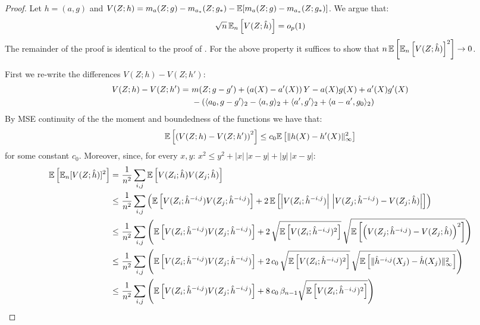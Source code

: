 \begin{proof}
Let $h=(a, g)$ and $V(Z; h)=m_{a}(Z; g) - m_{a_*}(Z; g_*) - \mathbb{E}[m_{a}(Z; g) - m_{a_*}(Z; g_*)]$. We argue that:
\begin{equation}
    \sqrt{n}\, \mathbb{E}_n\left[V(Z; \hat{h})\right] = o_p(1)
\end{equation}
The remainder of the proof is identical to the proof of . For the above property it suffices to show that $n\, \mathbb{E}\left[\mathbb{E}_n\left[V(Z; \hat{h})\right]^2\right] \to 0$.

First we re-write the differences $V(Z; h) - V(Z;h')$: 
\begin{align}
    V(Z; h) - V(Z;h') 
    =~& m(Z; g-g') + (a(X) - a'(X))\, Y - a(X) g(X) + a'(X) g'(X)\\
    & - \left(\langle a_0, g-g' \rangle_2 - \langle a, g \rangle_2 + \langle a', g' \rangle_2 + \langle a-a', g_0 \rangle_2\right)
\end{align}
By MSE continuity of the the moment and boundedness of the functions we have that:
\begin{equation}
\mathbb{E}\left[\left(V(Z; h) - V(Z; h')\right)^2\right] \leq c_0 \mathbb{E}\left[\|h(X) - h'(X)\|_{\infty}^2\right]
\end{equation}
for some constant $c_0$. Moreover, since, for every $x, y$: $x^2 \leq y^2 + |x|\, |x-y| + |y|\, |x-y|$:
\begin{align}
    \mathbb{E}\left[\mathbb{E}_n[V(Z; \hat{h})]^2\right] =~& \frac{1}{n^2} \sum_{i, j}\mathbb{E}\left[V(Z_i; \hat{h})  V(Z_j;\hat{h})\right]\\
    \leq~& \frac{1}{n^2}\sum_{i, j} \left(\mathbb{E}\left[V(Z_i;\hat{h}^{-i,j})  V(Z_j;\hat{h}^{-i,j})\right] + 2\, \mathbb{E}\left[\left|V(Z_i;\hat{h}^{-i,j})\right|\, \left|V(Z_j;\hat{h}^{-i,j}) - V(Z_j; \hat{h})\right|\right]\right)\\
    \leq~& \frac{1}{n^2}\sum_{i, j} \left(\mathbb{E}\left[V(Z_i;\hat{h}^{-i,j})  V(Z_j;\hat{h}^{-i,j})\right] + 2\, \sqrt{\mathbb{E}\left[V(Z_i;\hat{h}^{-i,j})^2\right]}\, \sqrt{\mathbb{E}\left[\left(V(Z_j;\hat{h}^{-i,j}) - V(Z_j; \hat{h})\right)^2\right]}\right)\\
    \leq~& \frac{1}{n^2}\sum_{i, j} \left(\mathbb{E}\left[V(Z_i;\hat{h}^{-i,j})  V(Z_j;\hat{h}^{-i,j})\right] + 2\, c_0\,  \sqrt{\mathbb{E}\left[V(Z_i;\hat{h}^{-i,j})^2\right]}\, \sqrt{\mathbb{E}\left[\|\hat{h}^{-i,j}(X_j) - \hat{h}(X_j)\|_{\infty}^2\right]}\right)\\
    \leq~& \frac{1}{n^2}\sum_{i, j} \left(\mathbb{E}\left[V(Z_i;\hat{h}^{-i,j})  V(Z_j;\hat{h}^{-i,j})\right] + 8\, c_0\, \beta_{n-1} \sqrt{\mathbb{E}\left[V(Z_i;\hat{h}^{-i,j})^2\right]}\right)
\end{align}

\end{proof}
